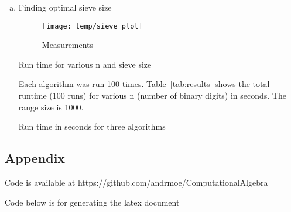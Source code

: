 \documentclass[12pt,a4paper]{article}
\begin{document}
\begin{enumerate}[a)]
    \item
    Finding optimal sieve size
    \begin{figure}[htbp]
        \centering
        \texttt{[image: temp/sieve\_plot]}
        \caption{Measurements}
        \label{figure1}
    \end{figure}
    {\begin{table}[H]
             \centering
             \caption{Run time for various n and sieve size}
             \label{tab:sieve_results}
             
        \end{table}}
    Each algorithm was run 100 times.
    Table~\ref{tab:results} shows the total runtime (100 runs) for various n (number of binary digits) in seconds.
    The range size is 1000.

    {\begin{table}[H]
             \centering
             \caption{Run time in seconds for three algorithms}
             \label{tab:results}
             
        \end{table}}

\end{enumerate}

\newpage
\begin{appendix}
\section*{Appendix}
    Code is available at https://github.com/andrmoe/ComputationalAlgebra
    
    
    
    

    
    
    
    \pagebreak
    Code below is for generating the latex document
    
    

\end{appendix}
\end{document}
